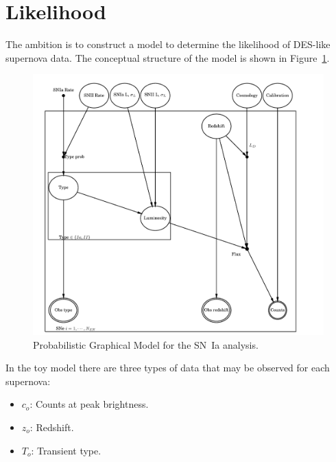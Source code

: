 \documentclass[preprint,3p]{elsarticle}
\begin{document}
%
%

\section{Likelihood}
\label{likelihood:sec}

The ambition is to construct a model to determine the likelihood of DES-like
supernova data.
The conceptual structure of the model is shown in Figure~\ref{pgm:fig}. 
\begin{figure}[htbp] %
   \centering
   \includegraphics[width=6.5in]{../results//nodes_pgm.pdf} 
   \caption{Probabilistic Graphical Model for the SN~Ia analysis.  
   \label{pgm:fig}}
\end{figure}

In the toy model there are three types of data that
may be observed for each supernova:
\begin{itemize}
\item $c_o$: Counts at peak brightness.
\item $z_o$: Redshift.
\item $T_o$: Transient type.
\end{itemize}
\end{document}
